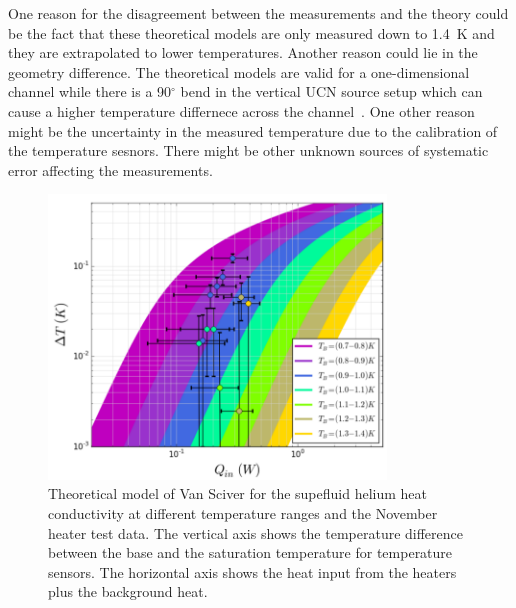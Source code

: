 One reason for the disagreement between the measurements and the
theory could be the fact that these theoretical models are only
measured down to 1.4~K and they are extrapolated to lower
temperatures. Another reason could lie in the geometry difference. The
theoretical models are valid for a one-dimensional channel while there
is a 90$^\circ$ bend in the vertical UCN source setup which can cause
a higher temperature differnece across the
channel~\cite{Florian_thesis}. One other reason might be the
uncertainty in the measured temperature due to the calibration of the
temperature sesnors. There might be other unknown sources of
systematic error affecting the measurements.


\begin{figure}[h!]
  \centering \includegraphics[width=0.8\textwidth]{November_Data.png}
  \caption[Comparison between the November heater test data and theoretical
  model of Van Sciver]{Theoretical model of Van Sciver for the supefluid helium
    heat conductivity at different temperature ranges and the November
    heater test data. The vertical axis shows the temperature
    difference between the base and the saturation temperature for
    temperature sensors. The horizontal axis shows the heat input from
    the heaters plus the background heat.}
\label{fig:November_Data}
\end{figure}
